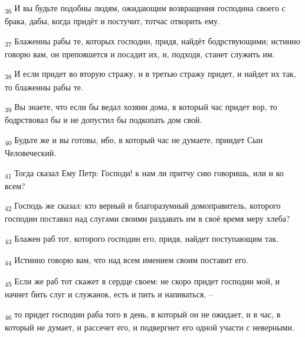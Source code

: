 \begin{tcolorbox}
\textsubscript{36} И вы будьте подобны людям, ожидающим возвращения господина своего с брака, дабы, когда придёт и постучит, тотчас отворить ему.
\end{tcolorbox}
\begin{tcolorbox}
\textsubscript{37} Блаженны рабы те, которых господин, придя, найдёт бодрствующими; истинно говорю вам, он препояшется и посадит их, и, подходя, станет служить им.
\end{tcolorbox}
\begin{tcolorbox}
\textsubscript{38} И если придет во вторую стражу, и в третью стражу придет, и найдет их так, то блаженны рабы те.
\end{tcolorbox}
\begin{tcolorbox}
\textsubscript{39} Вы знаете, что если бы ведал хозяин дома, в который час придет вор, то бодрствовал бы и не допустил бы подкопать дом свой.
\end{tcolorbox}
\begin{tcolorbox}
\textsubscript{40} Будьте же и вы готовы, ибо, в который час не думаете, приидет Сын Человеческий.
\end{tcolorbox}
\begin{tcolorbox}
\textsubscript{41} Тогда сказал Ему Петр: Господи! к нам ли притчу сию говоришь, или и ко всем?
\end{tcolorbox}
\begin{tcolorbox}
\textsubscript{42} Господь же сказал: кто верный и благоразумный домоправитель, которого господин поставил над слугами своими раздавать им в своё время меру хлеба?
\end{tcolorbox}
\begin{tcolorbox}
\textsubscript{43} Блажен раб тот, которого господин его, придя, найдет поступающим так.
\end{tcolorbox}
\begin{tcolorbox}
\textsubscript{44} Истинно говорю вам, что над всем имением своим поставит его.
\end{tcolorbox}
\begin{tcolorbox}
\textsubscript{45} Если же раб тот скажет в сердце своем: не скоро придет господин мой, и начнет бить слуг и служанок, есть и пить и напиваться, --
\end{tcolorbox}
\begin{tcolorbox}
\textsubscript{46} то придет господин раба того в день, в который он не ожидает, и в час, в который не думает, и рассечет его, и подвергнет его одной участи с неверными.
\end{tcolorbox}
